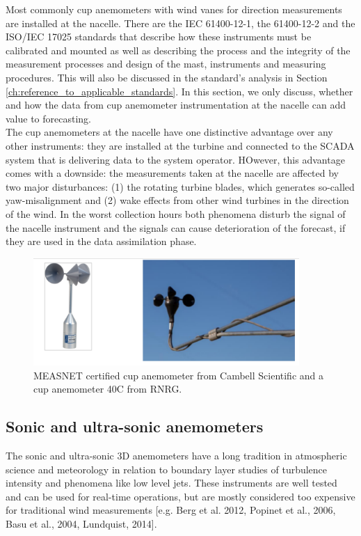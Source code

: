 Most commonly cup anemometers with wind vanes for direction measurements are installed at the nacelle. There are the IEC 61400-12-1, the 61400-12-2 and the ISO/IEC 17025 standards that describe how these instruments must be calibrated and mounted as well as describing the process and the integrity of the measurement processes and design of the mast, instruments and measuring procedures. This will also be discussed in the standard’s analysis in Section \ref{ch:reference_to_applicable_standards}. In this section, we only discuss, whether and how the data from cup anemometer instrumentation at the nacelle can add value to forecasting.\\
The cup anemometers at the nacelle have one distinctive advantage over any other instruments: they are installed at the turbine and connected to the SCADA system that is delivering data to the system operator. HOwever, this advantage comes with a downside: the measurements taken at the nacelle are affected by two major disturbances: (1) the rotating turbine blades, which generates so-called yaw-misalignment and (2) wake effects from other wind turbines in the direction of the wind. In the worst collection hours both phenomena disturb the signal of the nacelle instrument and the signals can cause deterioration of the forecast, if they are used in the data assimilation phase.

\begin{figure}[h!]
\includegraphics[width=0.9\textwidth]{figures/anemometer_cup.png}
\vspace{-0.2cm}\caption{MEASNET certified cup anemometer from Cambell Scientific and a cup anemometer 40C from RNRG.}
\label{fig:measnet_cup_anemometers}
\end{figure}


\subsection{Sonic and ultra-sonic anemometers}
The sonic and ultra-sonic 3D anemometers have a long tradition in atmospheric science and meteorology in relation to boundary layer studies of turbulence intensity and phenomena like low level jets. These instruments are well tested and can be used for real-time operations, but are mostly considered too expensive for traditional wind measurements [e.g. Berg  et al. 2012, Popinet et al., 2006, Basu et al., 2004, Lundquist, 2014]. 

